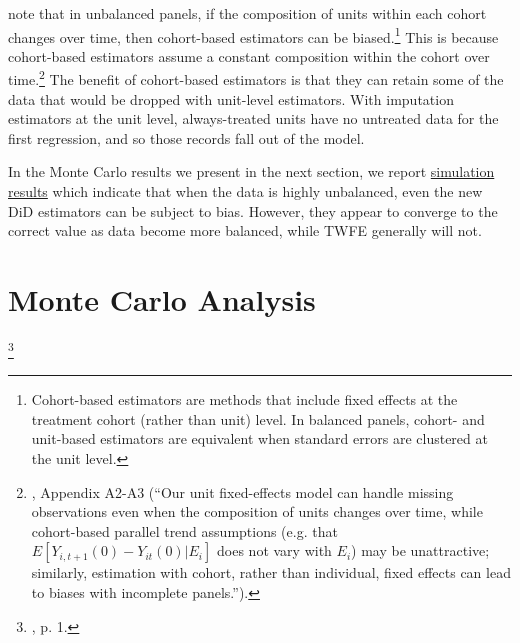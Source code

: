 \documentclass[12pt]{article}
\begin{document}
\citet{borusyak2024revisiting} note that in unbalanced panels, if the composition of units within each cohort changes over time, then cohort-based estimators can be biased.\footnote{Cohort-based estimators are methods that include fixed effects at the treatment cohort (rather than unit) level. In balanced panels, cohort- and unit-based estimators are equivalent when standard errors are clustered at the unit level.}  This is because cohort-based estimators assume a constant composition within the cohort over time.\footnote{\citet{borusyak2024revisiting}, Appendix A2-A3 (“Our unit fixed-effects model can handle missing observations even when the composition of units changes over time, while cohort-based parallel trend assumptions (e.g. that $E[Y_{i,t+1}(0) - Y_{it}(0) | E_i]$ does not vary with $E_i$) may be unattractive; similarly, estimation with cohort, rather than individual, fixed effects can lead to biases with incomplete panels.”).}  The benefit of cohort-based estimators is that they can retain some of the data that would be dropped with unit-level estimators. With imputation estimators at the unit level, always-treated units have no untreated data for the first regression, and so those records fall out of the model.

In the Monte Carlo results we present in the next section, we report \hyperref[fig:estimators-balanced]{simulation results} which indicate that when the data is highly unbalanced, even the new DiD estimators can be subject to bias. However, they appear to converge to the correct value as data become more balanced, while TWFE generally will not.

\section{Monte Carlo Analysis} \label{sec:analysis}
\begin{singlespace*}
\footnote{\citet{gardner2022a}, p. 1.}\end{singlespace*}
\end{document}

